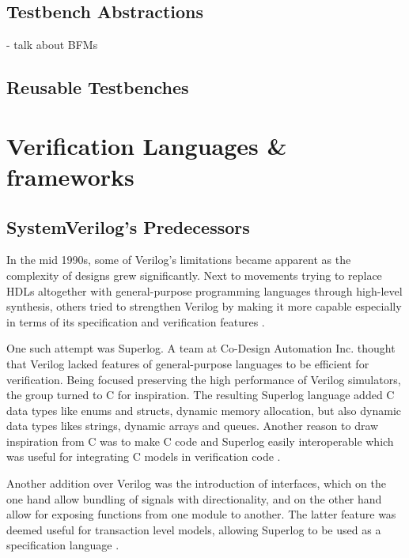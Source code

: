\documentclass[12pt]{report}
\begin{document}
\subsection{Testbench Abstractions} %

- talk about BFMs

\subsection{Reusable Testbenches} %

\section{Verification Languages \& frameworks} %

\subsection{SystemVerilog's Predecessors} %

In the mid 1990s, some of Verilog's limitations became apparent as the complexity of designs grew significantly. Next
to movements trying to replace HDLs altogether with general-purpose programming languages through high-level
synthesis, others tried to strengthen Verilog by making it more capable especially in terms of its specification and
verification features \cite[Sec. 6]{flake2020a}.

One such attempt was Superlog. A team at Co-Design Automation Inc. thought that Verilog lacked features of
general-purpose languages to be efficient for verification. Being focused preserving the high performance of Verilog
simulators, the group turned to C for inspiration. The resulting Superlog language added C data types like enums and
structs, dynamic memory allocation, but also dynamic data types likes strings, dynamic arrays and queues. Another
reason to draw inspiration from C was to make C code and Superlog easily interoperable which was useful for
integrating C models in verification code \cite[Sec. 6]{flake2020a}.

Another addition over Verilog was the introduction of interfaces, which on the one hand allow bundling of signals
with directionality, and on the other hand allow for exposing functions from one module to another. The latter
feature was deemed useful for transaction level models, allowing Superlog to be used as a specification language
\cite[Sec. 6]{flake2020a}.
\end{document}
